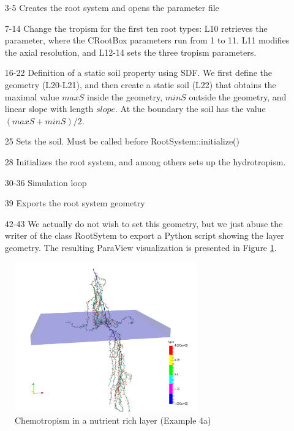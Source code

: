 \documentclass[a4paper]{article}
\begin{document}
\begin{itemize}

\item[3-5] Creates the root system and opens the parameter file

\item[7-14] Change the tropism for the first ten root types: L10 retrieves the parameter, where the CRootBox parameters run from 1 to 11. L11 modifies the axial resolution, and L12-14 sets the three tropism parameters. 

\item[16-22] Definition of a static soil property using SDF. We first define the geometry (L20-L21), and then create a static soil (L22) that obtains the maximal value $maxS$ inside the geometry, 
$minS$ outside the geometry, and linear slope with length $slope$. At the boundary the soil has the value $(maxS+minS)/2$.

\item[25] Sets the soil. Must be called before RootSystem::initialize()

\item[28] Initializes the root system, and among others sets up the hydrotropism. 

\item[30-36] Simulation loop

\item[39] Exports the root system geometry

\item[42-43] We actually do not wish to set this geometry, but we just abuse the writer of the class RootSytem to export a Python script showing the layer geometry. The resulting ParaView visualization is presented in Figure \ref{fig:chemo}.

\end{itemize}

\begin{figure}
\centering
\includegraphics[width=0.7\textwidth]{example4a.png}
\caption{Chemotropism in a nutrient rich layer (Example 4a)} \label{fig:chemo}
\end{figure}
\end{document}
